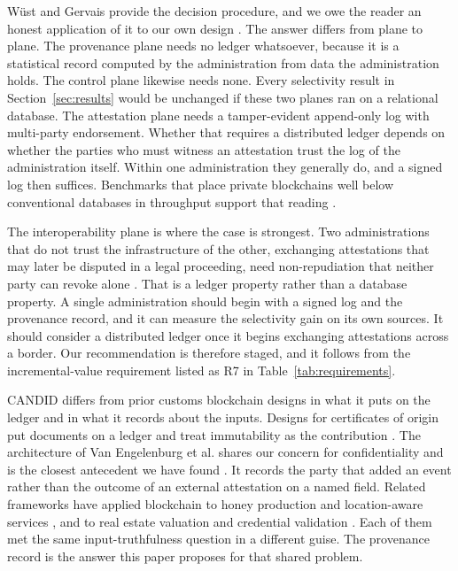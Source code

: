 \documentclass[information,article,submit,moreauthors]{Definitions/mdpi}
\begin{document}
W\"ust and Gervais provide the decision procedure, and we owe the reader an honest application of it to our own design \cite{wust2018needblockchain}. The answer differs from plane to plane. The provenance plane needs no ledger whatsoever, because it is a statistical record computed by the administration from data the administration holds. The control plane likewise needs none. Every selectivity result in Section~\ref{sec:results} would be unchanged if these two planes ran on a relational database. The attestation plane needs a tamper-evident append-only log with multi-party endorsement. Whether that requires a distributed ledger depends on whether the parties who must witness an attestation trust the log of the administration itself. Within one administration they generally do, and a signed log then suffices. Benchmarks that place private blockchains well below conventional databases in throughput support that reading \cite{dinh2017blockbench}.

The interoperability plane is where the case is strongest. Two administrations that do not trust the infrastructure of the other, exchanging attestations that may later be disputed in a legal proceeding, need non-repudiation that neither party can revoke alone \cite{warkentin2020triad}. That is a ledger property rather than a database property. A single administration should begin with a signed log and the provenance record, and it can measure the selectivity gain on its own sources. It should consider a distributed ledger once it begins exchanging attestations across a border. Our recommendation is therefore staged, and it follows from the incremental-value requirement listed as R7 in Table~\ref{tab:requirements}.

CANDID differs from prior customs blockchain designs in what it puts on the ledger and in what it records about the inputs. Designs for certificates of origin put documents on a ledger and treat immutability as the contribution \cite{tyagi2023origin,kim2023railroad}. The architecture of Van Engelenburg et al. shares our concern for confidentiality and is the closest antecedent we have found \cite{vanengelenburg2019b2g}. It records the party that added an event rather than the outcome of an external attestation on a named field. Related frameworks have applied blockchain to honey production \cite{almiani2025honey} and location-aware services \cite{almiani2023auction}, and to real estate valuation \cite{almiani2026realestate} and credential validation \cite{aljaziri2026skillchain}. Each of them met the same input-truthfulness question in a different guise. The provenance record is the answer this paper proposes for that shared problem.
\end{document}
